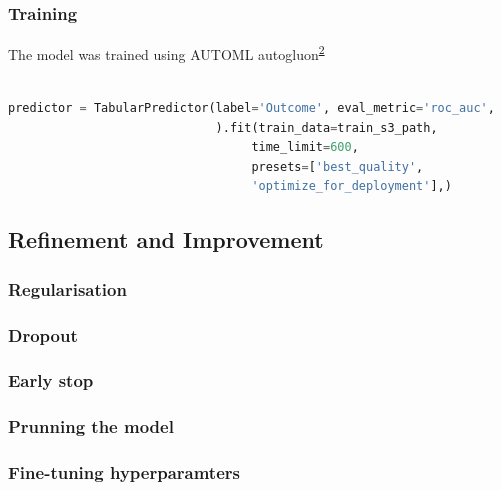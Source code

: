 \documentclass[
]{article}
\begin{document}
\hypertarget{training}{%
\subsubsection{Training}\label{training}}

The model was trained using AUTOML
autogluon\textsuperscript{\protect\hyperlink{ref-auto}{2}}

\begin{lstlisting}[language=python]
%%time

predictor = TabularPredictor(label='Outcome', eval_metric='roc_auc',
                             ).fit(train_data=train_s3_path,
                                  time_limit=600,
                                  presets=['best_quality',
                                  'optimize_for_deployment'],)
\end{lstlisting}

\hypertarget{refinement-and-improvement}{%
\subsection{Refinement and
Improvement}\label{refinement-and-improvement}}

\hypertarget{regularisation}{%
\subsubsection{Regularisation}\label{regularisation}}

\hypertarget{dropout}{%
\subsubsection{Dropout}\label{dropout}}

\hypertarget{early-stop}{%
\subsubsection{Early stop}\label{early-stop}}

\hypertarget{prunning-the-model}{%
\subsubsection{Prunning the model}\label{prunning-the-model}}

\hypertarget{fine-tuning-hyperparamters}{%
\subsubsection{Fine-tuning
hyperparamters}\label{fine-tuning-hyperparamters}}
\end{document}
